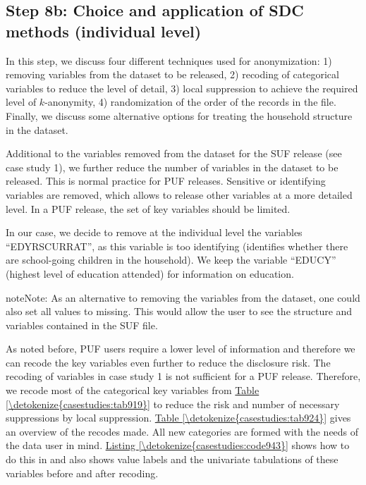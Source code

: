 \documentclass[letterpaper,10pt,english]{sphinxmanual}
\begin{document}
\subsection{Step 8b: Choice and application of SDC methods (individual level)}
\label{\detokenize{casestudies:id14}}
In this step, we discuss four different techniques used for
anonymization: 1) removing variables from the dataset to be released, 2)
recoding of categorical variables to reduce the level of detail, 3)
local suppression to achieve the required level of \(k\)-anonymity,
4) randomization of the order of the records in the file. Finally, we
discuss some alternative options for treating the household structure in
the dataset.


Additional to the variables removed from the dataset for the SUF release
(see case study 1), we further reduce the number of variables in the
dataset to be released. This is normal practice for PUF releases.
Sensitive or identifying variables are removed, which allows to release
other variables at a more detailed level. In a PUF release, the set of
key variables should be limited.

In our case, we decide to remove at the individual level the variables
“EDYRSCURRAT”, as this variable is too identifying (identifies whether
there are school-going children in the household). We keep the variable
“EDUCY” (highest level of education attended) for information on
education.

\begin{sphinxadmonition}{note}{Note:}
As an alternative to removing the variables from the
dataset, one could also set all values to missing. This would allow the
user to see the structure and variables contained in the SUF file.
\end{sphinxadmonition}


As noted before, PUF users require a lower level of information and
therefore we can recode the key variables even further to reduce the
disclosure risk. The recoding of variables in case study 1 is not
sufficient for a PUF release. Therefore, we recode most of the
categorical key variables from \hyperref[\detokenize{casestudies:tab919}]{Table \ref{\detokenize{casestudies:tab919}}} to reduce the risk and number
of necessary suppressions by local suppression. \hyperref[\detokenize{casestudies:tab924}]{Table \ref{\detokenize{casestudies:tab924}}} gives an
overview of the recodes made. All new categories are formed with the
needs of the data user in mind. \hyperref[\detokenize{casestudies:code943}]{Listing \ref{\detokenize{casestudies:code943}}} shows how to do this in 
and also shows value labels and the univariate tabulations of these
variables before and after recoding.
\end{document}
